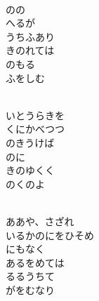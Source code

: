 \documentclass[10pt,b5j]{tarticle} %
\begin{document}
\vspace{1.5em} %
\newcommand{\linespace}{0.5em} %
\newcommand{\blocksize}{0.5\hsize} %
\newcommand{\itemmargin}{6em} %
\begin{enumerate} %
    \setlength{\itemindent}{\itemmargin} %
    \begin{minipage}[c]{\blocksize}
    
        \vspace{\linespace}
        \item~\\
        のの\\
        へるが\\
        うちふあり\\
        きのれては\\
        のもる\\
        ふをしむ
        
        \vspace{\linespace}
        \item~\\
        いとうらきを\\
        くにかべつつ\\
        のきうけば\\
        のに\\
        きのゆくく\\
        のくのよ
        
        \vspace{\linespace}
        \item~\\
        ああや、さざれ\\
        いるかのにをひそめ\\
        にもなく\\
        あるをめては\\
        るるうちて\\
        がをむなり
        

\end{minipage}
\end{enumerate}
\end{document}
